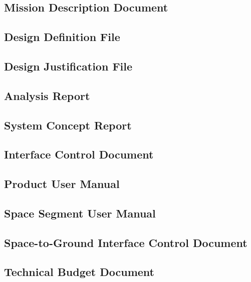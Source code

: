 \subsection{Mission Description Document}
\label{app:Mission Description Document}


\subsection{Design Definition File}
\label{app:Design Definition File}


\subsection{Design Justification File}
\label{app:Design Justification File}


\subsection{Analysis Report}
\label{app:Analysis Report}


\subsection{System Concept Report}
\label{app:System Concept Report}


\subsection{Interface Control Document}
\label{app:Interface Control Document}


\subsection{Product User Manual}
\label{app:Product User Manual}


\subsection{Space Segment User Manual}
\label{app:Space Segment User Manual}


\subsection{Space-to-Ground Interface Control Document}
\label{app:Space-to-Ground Interface Control Document}


\subsection{Technical Budget Document}
\label{app:Technical Budget Document}


